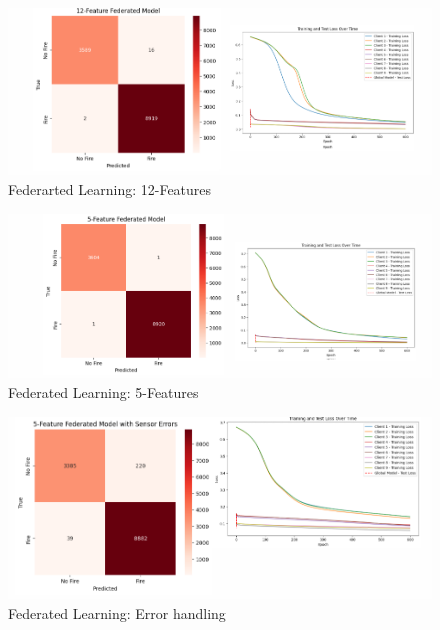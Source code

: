 \documentclass[conference]{IEEEtran}
\begin{document}
\begin{figure}
    \centering
    \includegraphics[width=1\linewidth]{images/12Fed.png}
    \caption{Federarted Learning: 12-Features}
    \label{fig:6.0}
\end{figure}

\begin{figure}
    \centering
    \includegraphics[width=1\linewidth]{images/5Fed.png}
    \caption{Federated Learning: 5-Features}
    \label{fig:6.1}
\end{figure}

\begin{figure}
    \centering
    \includegraphics[width=1\linewidth]{images/FedHandling.png}
    \caption{Federated Learning: Error handling}
    \label{fig:6.2}
\end{figure}
\end{document}

